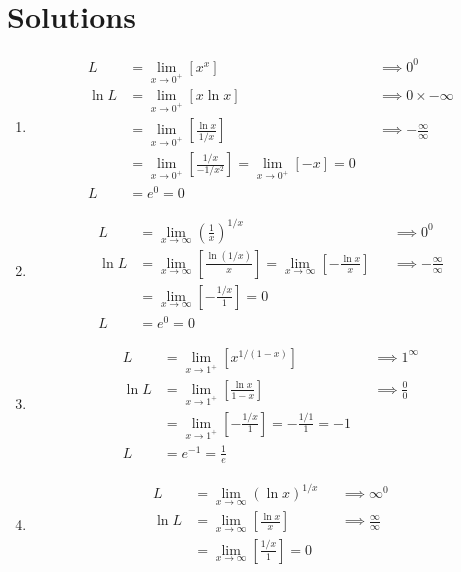 \documentclass[12pt, A4]{report}
\begin{document}
		\section*{Solutions}
			\begin{enumerate}
				\item
					\begin{align*}
						L &= \lim_{x\to 0^+}\left[x^x\right]
								&&\implies 0^0 \\
						\ln L &= \lim_{x\to 0^+}\left[x\ln x\right]
								&&\implies 0 \times -\infty \\
							&= \lim_{x\to 0^+}\left[\frac{\ln x}{1/x}\right]
								&&\implies -\frac{\infty}{\infty} \\
							&= \lim_{x\to 0^+}\left[\frac{1/x}{-1/x^2}\right]
								= \lim_{x\to 0^+}[-x] = 0 \\
						L &= e^0 
								= 0
					\end{align*}
				\item
					\begin{align*}
						L &= \lim_{x\to\infty}\left(\frac{1}{x}\right)^{1/x}
								&&\implies 0^0 \\
						\ln L &= \lim_{x\to\infty}\left[\frac{\ln(1/x)}{x}\right]
								= \lim_{x\to\infty}\left[-\frac{\ln x}{x}\right]
								&&\implies -\frac{\infty}{\infty} \\
							&= \lim_{x\to\infty}\left[-\frac{1/x}{1}\right]
								= 0 \\
						L &= e^0
								= 0
					\end{align*}
				\item
					\begin{align*}
						L &= \lim_{x\to 1^+}\left[x^{1/(1-x)}\right]
								&&\implies 1^{\infty} \\
						\ln L &= \lim_{x\to 1^+}\left[\frac{\ln x}{1 - x}\right]
								&&\implies \frac{0}{0} \\
							&= \lim_{x\to 1^+}\left[-\frac{1/x}{1}\right] 
								= -\frac{1/1}{1} = -1 \\
						L &= e^{-1} 
								= \frac{1}{e}
					\end{align*}
				\item
					\begin{align*}
						L &= \lim_{x\to\infty} (\ln x)^{1/x}
								&&\implies \infty^0 \\
						\ln L &= \lim_{x\to\infty}\left[\frac{\ln x}{x}\right]
								&&\implies \frac{\infty}{\infty} \\
							&= \lim_{x\to\infty}\left[\frac{1/x}{1}\right] = 0 \\

\end{align*}
\end{enumerate}
\end{document}
